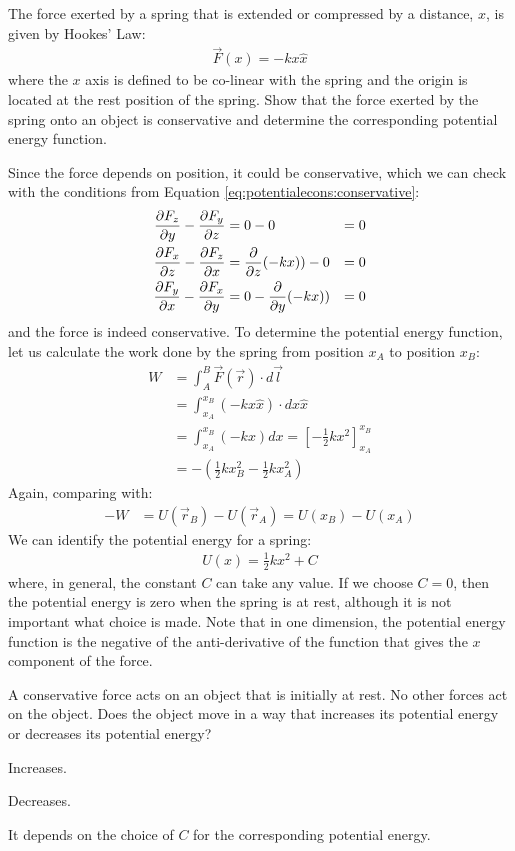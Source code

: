 \begin{example}{\label{ex:potentialecons:springpotential}The force exerted by a spring that is extended or compressed by a distance, $x$, is given by Hookes' Law:
\begin{align*}
\vec F(x) = -k x\hat x
\end{align*}
where the $x$ axis is defined to be co-linear with the spring and the origin is located at the rest position of the spring. Show that the force exerted by the spring onto an object is conservative and determine the corresponding potential energy function.}

Since the force depends on position, it could be conservative, which we can check with the conditions from Equation \ref{eq:potentialecons:conservative}:
\begin{align*}
\frac{\partial F_z}{\partial y}-\frac{\partial F_y}{\partial z} &= 0 - 0 &= 0\\
\frac{\partial F_x}{\partial z}-\frac{\partial F_z}{\partial x} &= \frac{\partial }{\partial z}(-kx)) - 0&= 0\\
\frac{\partial F_y}{\partial x}-\frac{\partial F_x}{\partial y} &= 0 - \frac{\partial }{\partial y}(-kx)) &=0
\end{align*}
and the force is indeed conservative. To determine the potential energy function, let us calculate the work done by the spring from position $x_A$ to position $x_B$:
\begin{align*}
W &=\int_A^B \vec F(\vec r) \cdot d\vec l\\
&=\int_{x_A}^{x_B} (-kx\hat x) \cdot dx \hat x\\
&=\int_{x_A}^{x_B} (-kx)dx=\left[-\frac{1}{2}kx^2  \right]_{x_A}^{x_B}\\
&=-\left( \frac{1}{2}kx_B^2-\frac{1}{2}kx_A^2 \right)
\end{align*}
Again, comparing with:
\begin{align*}
-W &= U(\vec r_B) - U(\vec r_A) = U(x_B) - U(x_A)
\end{align*}
We can identify the potential energy for a spring:
\begin{align*}
U(x) = \frac{1}{2}kx^2 + C
\end{align*}
where, in general, the constant $C$ can take any value. If we choose $C=0$, then the potential energy is zero when the spring is at rest, although it is not important what choice is made. Note that in one dimension, the potential energy function is the negative of the anti-derivative of the function that gives the $x$ component of the force.
\end{example}

\begin{checkpoint}
\begin{MCquestion}{A conservative force acts on an object that is initially at rest. No other forces act on the object. Does the object move in a way that increases its potential energy or decreases its potential energy?}
\item Increases.
\item Decreases. \correct
\item It depends on the choice of $C$ for the corresponding potential energy.
\end{MCquestion}
\end{checkpoint}

